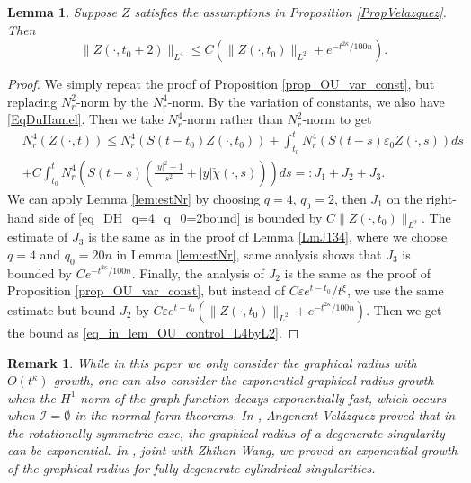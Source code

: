 \documentclass[11pt]{amsart}
\numberwithin{equation}{section}
\newtheorem{lemma}[theorem]{Lemma}
\newtheorem{remark}[theorem]{Remark}
\numberwithin{equation}{section}
\newcommand{\eps}{\varepsilon}
\begin{document}
	\begin{lemma}\label{lem_OU_control_L4byL2}
		Suppose $Z$ satisfies the assumptions in Proposition \ref{PropVelazquez}. Then
		\begin{equation}\label{eq_in_lem_OU_control_L4byL2}
			\|Z(\cdot,t_0+2)\|_{L^4}\leq C(\|Z(\cdot,t_0)\|_{L^2}+e^{-t^{2\kappa}/100n}).
		\end{equation}
	\end{lemma}
	\begin{proof}
		We simply repeat the proof of Proposition \ref{prop_OU_var_const}, but replacing $N^2_r$-norm by the $N^4_r$-norm. By the variation of constants, we also have \eqref{EqDuHamel}. Then we take $N^4_r$-norm rather than $N^2_r$-norm to get 
		\begin{equation}\label{eq_DH_q=4_q_0=2bound}
			\begin{aligned}
				&N_r^4(Z(\cdot,t))\leq N^4_r(S(t-t_0)Z(\cdot,t_0))
				+
				\int_{t_0}^t N^4_r(S(t-s)\eps_0Z(\cdot,s))ds\\
				&+
				C\int_{t_0}^tN^4_r\left(S(t-s)\left(\frac{|y|^2+1}{s^2}+|y|\check\chi(\cdot,s)\right)\right)ds=:J_1+J_2+J_3.
			\end{aligned}
		\end{equation}
		We can apply Lemma \ref{lem:estNr} by choosing $q=4$, $q_0=2$, then $J_1$ on the right-hand side of \eqref{eq_DH_q=4_q_0=2bound} is bounded by $C\|Z(\cdot,t_0)\|_{L^2}$. The estimate of $J_3$ is the same as in the proof of Lemma \ref{LmJ134}, where we choose $q=4$ and $q_0=20n$ in Lemma \ref{lem:estNr}, same analysis shows that $J_3$ is bounded by $Ce^{-t^{2\kappa}/100n}$. Finally, the analysis of $J_2$ is the same as the proof of Proposition \ref{prop_OU_var_const}, but instead of $C\eps e^{t-t_0}/t^\xi$, we use the same estimate but bound $J_2$ by $C\eps e^{t-t_0}(\|Z(\cdot,t_0)\|_{L^2}+e^{-t^{2\kappa}/100n})$. Then we get the bound as \eqref{eq_in_lem_OU_control_L4byL2}.
	\end{proof}
	
	
	
	
	\begin{remark}
		While in this paper we only consider the graphical radius with $O(t^{\kappa})$ growth, one can also consider the exponential graphical radius growth when the $H^1$ norm of the graph function decays exponentially fast, which occurs when $\mathcal I=\emptyset$ in the normal form theorems. In \cite{AV}, Angenent-Vel\'azquez proved that in the rotationally symmetric case, the graphical radius of a degenerate singularity can be exponential. In \cite{SunWangXue2_RegSing}, joint with Zhihan Wang, we proved an exponential growth of the graphical radius for fully degenerate cylindrical singularities.
	\end{remark}
	
\end{document}
